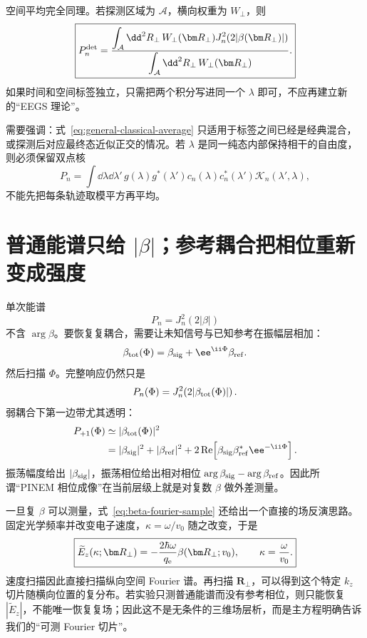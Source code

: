 空间平均完全同理。若探测区域为 \(\mathcal A\)，横向权重为 \(W_\perp\)，则
\begin{equation}
\boxed{
P_n^{\rm det}
=\frac{\displaystyle
\int_{\mathcal A}\dd^2R_\perp\,W_\perp(\bm R_\perp)
J_n^2\!\left(2|\beta(\bm R_\perp)|\right)}
{\displaystyle
\int_{\mathcal A}\dd^2R_\perp\,W_\perp(\bm R_\perp)}.}
\label{eq:spatial-detector-average}
\end{equation}
如果时间和空间标签独立，只需把两个积分写进同一个 \(\lambda\) 即可，不应再建立新的“EEGS 理论”。

需要强调：式~\eqref{eq:general-classical-average} 只适用于标签之间已经是经典混合，或探测后对应最终态近似正交的情况。若 \(\lambda\) 是同一纯态内部保持相干的自由度，则必须保留双点核
\begin{equation}
P_n
=\int\dd\lambda\dd\lambda'\,
g(\lambda)g^*(\lambda')
c_n(\lambda)c_n^*(\lambda')
\mathcal K_n(\lambda',\lambda),
\label{eq:coherent-average-kernel}
\end{equation}
不能先把每条轨迹取模平方再平均。

\section{普通能谱只给 \texorpdfstring{$|\beta|$}{|beta|}；参考耦合把相位重新变成强度}

单次能谱
\begin{equation}
P_n=J_n^2(2|\beta|)
\end{equation}
不含 \(\arg\beta\)。要恢复复耦合，需要让未知信号与已知参考在振幅层相加：
\begin{equation}
\beta_{\rm tot}(\Phi)
=\beta_{\rm sig}+\ee^{\ii\Phi}\beta_{\rm ref}.
\label{eq:reference-beta}
\end{equation}
然后扫描 \(\Phi\)。完整响应仍然只是
\begin{equation}
P_n(\Phi)
=J_n^2\!\left(2|\beta_{\rm tot}(\Phi)|\right).
\end{equation}
弱耦合下第一边带尤其透明：
\begin{align}
P_{+1}(\Phi)
&\simeq|\beta_{\rm tot}(\Phi)|^2\\
&=|\beta_{\rm sig}|^2+|\beta_{\rm ref}|^2
+2\operatorname{Re}\!\left[
\beta_{\rm sig}\beta_{\rm ref}^*\ee^{-\ii\Phi}
\right].
\label{eq:heterodyne-beta-weak}
\end{align}
振荡幅度给出 \(|\beta_{\rm sig}|\)，振荡相位给出相对相位 \(\arg\beta_{\rm sig}-\arg\beta_{\rm ref}\)。因此所谓“PINEM 相位成像”在当前层级上就是对复数 \(\beta\) 做外差测量。

一旦复 \(\beta\) 可以测量，式~\eqref{eq:beta-fourier-sample} 还给出一个直接的场反演思路。固定光学频率并改变电子速度，\(\kappa=\omega/v_0\) 随之改变，于是
\begin{equation}
\boxed{
\widetilde E_z(\kappa;\bm R_\perp)
=-\frac{2\hbar\omega}{q_{\rm e}}
\beta(\bm R_\perp;v_0),
\qquad
\kappa=\frac{\omega}{v_0}.}
\label{eq:velocity-tomography}
\end{equation}
速度扫描因此直接扫描纵向空间 Fourier 谱。再扫描 \(\bm R_\perp\)，可以得到这个特定 \(k_z\) 切片随横向位置的复分布。若实验只测普通能谱而没有参考相位，则只能恢复 \(|\widetilde E_z|\)，不能唯一恢复复场；因此这不是无条件的三维场层析，而是主方程明确告诉我们的“可测 Fourier 切片”。

